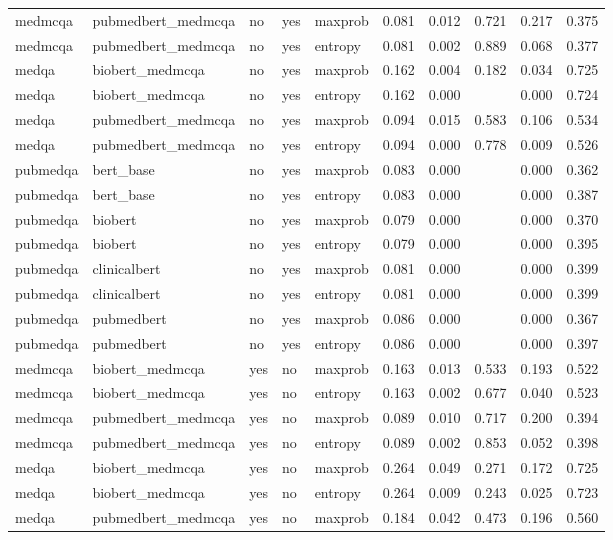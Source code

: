 \begin{table}[htbp]
\begin{tabular}{llllllllll}
medmcqa & pubmedbert\_medmcqa & no & yes & maxprob & 0.081 & 0.012 & 0.721 & 0.217 & 0.375 \\
medmcqa & pubmedbert\_medmcqa & no & yes & entropy & 0.081 & 0.002 & 0.889 & 0.068 & 0.377 \\
medqa & biobert\_medmcqa & no & yes & maxprob & 0.162 & 0.004 & 0.182 & 0.034 & 0.725 \\
medqa & biobert\_medmcqa & no & yes & entropy & 0.162 & 0.000 &  & 0.000 & 0.724 \\
medqa & pubmedbert\_medmcqa & no & yes & maxprob & 0.094 & 0.015 & 0.583 & 0.106 & 0.534 \\
medqa & pubmedbert\_medmcqa & no & yes & entropy & 0.094 & 0.000 & 0.778 & 0.009 & 0.526 \\
pubmedqa & bert\_base & no & yes & maxprob & 0.083 & 0.000 &  & 0.000 & 0.362 \\
pubmedqa & bert\_base & no & yes & entropy & 0.083 & 0.000 &  & 0.000 & 0.387 \\
pubmedqa & biobert & no & yes & maxprob & 0.079 & 0.000 &  & 0.000 & 0.370 \\
pubmedqa & biobert & no & yes & entropy & 0.079 & 0.000 &  & 0.000 & 0.395 \\
pubmedqa & clinicalbert & no & yes & maxprob & 0.081 & 0.000 &  & 0.000 & 0.399 \\
pubmedqa & clinicalbert & no & yes & entropy & 0.081 & 0.000 &  & 0.000 & 0.399 \\
pubmedqa & pubmedbert & no & yes & maxprob & 0.086 & 0.000 &  & 0.000 & 0.367 \\
pubmedqa & pubmedbert & no & yes & entropy & 0.086 & 0.000 &  & 0.000 & 0.397 \\
medmcqa & biobert\_medmcqa & yes & no & maxprob & 0.163 & 0.013 & 0.533 & 0.193 & 0.522 \\
medmcqa & biobert\_medmcqa & yes & no & entropy & 0.163 & 0.002 & 0.677 & 0.040 & 0.523 \\
medmcqa & pubmedbert\_medmcqa & yes & no & maxprob & 0.089 & 0.010 & 0.717 & 0.200 & 0.394 \\
medmcqa & pubmedbert\_medmcqa & yes & no & entropy & 0.089 & 0.002 & 0.853 & 0.052 & 0.398 \\
medqa & biobert\_medmcqa & yes & no & maxprob & 0.264 & 0.049 & 0.271 & 0.172 & 0.725 \\
medqa & biobert\_medmcqa & yes & no & entropy & 0.264 & 0.009 & 0.243 & 0.025 & 0.723 \\
medqa & pubmedbert\_medmcqa & yes & no & maxprob & 0.184 & 0.042 & 0.473 & 0.196 & 0.560 \\

\end{tabular}
\end{table}
